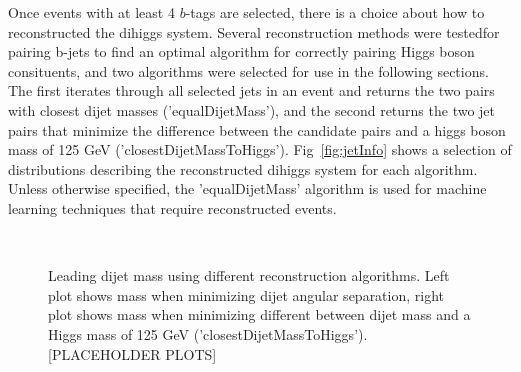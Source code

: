 Once events with at least 4 $b$-tags are selected, there is a choice about how to reconstructed the dihiggs system. Several reconstruction methods were testedfor pairing b-jets to find an optimal algorithm for correctly pairing Higgs boson consituents, and two algorithms were selected for use in the following sections. The first iterates through all selected jets in an event and returns the two pairs with closest dijet masses ('equalDijetMass'), and the second returns the two jet pairs that minimize the difference between the candidate pairs and a higgs boson mass of 125 GeV ('closestDijetMassToHiggs'). Fig~\ref{fig:jetInfo} shows a selection of distributions describing the reconstructed dihiggs system for each algorithm. Unless otherwise specified, the 'equalDijetMass' algorithm is used for machine learning techniques that require reconstructed events.

\begin{figure}[ht!]
  \begin{center}
  \\
  \caption{Leading dijet mass using different reconstruction algorithms. Left plot shows mass when minimizing dijet angular separation, right plot shows mass when minimizing different between dijet mass and a Higgs mass of 125 GeV ('closestDijetMassToHiggs'). [PLACEHOLDER PLOTS]}
  \label{fig:eventQuantities}
  \end{center}
\end{figure}

